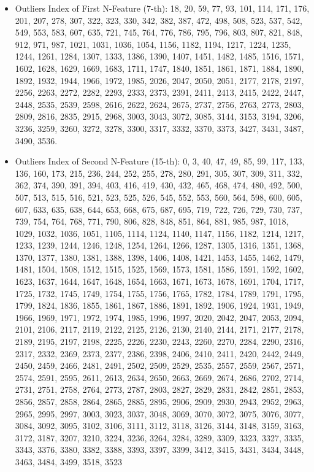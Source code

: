 \documentclass{article}
\begin{document}
\begin{itemize}
    \item Outliers Index of First N-Feature (7-th): 18, 20, 59, 77, 93, 101, 114, 171, 176, 201, 207, 278, 307, 322, 323, 330, 342, 382, 387, 472, 498, 508, 523, 537, 542, 549, 553, 583, 607, 635, 721, 745, 764, 776, 786, 795, 796, 803, 807, 821, 848, 912, 971, 987, 1021, 1031, 1036, 1054, 1156, 1182, 1194, 1217, 1224, 1235, 1244, 1261, 1284, 1307, 1333, 1386, 1390, 1407, 1451, 1482, 1485, 1516, 1571, 1602, 1628, 1629, 1669, 1683, 1711, 1747, 1840, 1851, 1861, 1871, 1884, 1890, 1892, 1932, 1944, 1966, 1972, 1985, 2026, 2047, 2050, 2051, 2177, 2178, 2197, 2256, 2263, 2272, 2282, 2293, 2333, 2373, 2391, 2411, 2413, 2415, 2422, 2447, 2448, 2535, 2539, 2598, 2616, 2622, 2624, 2675, 2737, 2756, 2763, 2773, 2803, 2809, 2816, 2835, 2915, 2968, 3003, 3043, 3072, 3085, 3144, 3153, 3194, 3206, 3236, 3259, 3260, 3272, 3278, 3300, 3317, 3332, 3370, 3373, 3427, 3431, 3487, 3490, 3536.
    \item Outliers Index of Second N-Feature (15-th): 0, 3, 40, 47, 49, 85, 99, 117, 133, 136, 160, 173, 215, 236, 244, 252, 255, 278, 280, 291, 305, 307, 309, 311, 332, 362, 374, 390, 391, 394, 403, 416, 419, 430, 432, 465, 468, 474, 480, 492, 500, 507, 513, 515, 516, 521, 523, 525, 526, 545, 552, 553, 560, 564, 598, 600, 605, 607, 633, 635, 638, 644, 653, 668, 675, 687, 695, 719, 722, 726, 729, 730, 737, 739, 754, 764, 768, 771, 790, 806, 828, 848, 851, 864, 881, 985, 987, 1018, 1029, 1032, 1036, 1051, 1105, 1114, 1124, 1140, 1147, 1156, 1182, 1214, 1217, 1233, 1239, 1244, 1246, 1248, 1254, 1264, 1266, 1287, 1305, 1316, 1351, 1368, 1370, 1377, 1380, 1381, 1388, 1398, 1406, 1408, 1421, 1453, 1455, 1462, 1479, 1481, 1504, 1508, 1512, 1515, 1525, 1569, 1573, 1581, 1586, 1591, 1592, 1602, 1623, 1637, 1644, 1647, 1648, 1654, 1663, 1671, 1673, 1678, 1691, 1704, 1717, 1725, 1732, 1745, 1749, 1754, 1755, 1756, 1765, 1782, 1784, 1789, 1791, 1795, 1799, 1824, 1836, 1855, 1861, 1867, 1886, 1891, 1892, 1906, 1924, 1931, 1949, 1966, 1969, 1971, 1972, 1974, 1985, 1996, 1997, 2020, 2042, 2047, 2053, 2094, 2101, 2106, 2117, 2119, 2122, 2125, 2126, 2130, 2140, 2144, 2171, 2177, 2178, 2189, 2195, 2197, 2198, 2225, 2226, 2230, 2243, 2260, 2270, 2284, 2290, 2316, 2317, 2332, 2369, 2373, 2377, 2386, 2398, 2406, 2410, 2411, 2420, 2442, 2449, 2450, 2459, 2466, 2481, 2491, 2502, 2509, 2529, 2535, 2557, 2559, 2567, 2571, 2574, 2591, 2595, 2611, 2613, 2634, 2650, 2663, 2669, 2674, 2686, 2702, 2714, 2731, 2751, 2758, 2764, 2773, 2787, 2803, 2827, 2829, 2831, 2842, 2851, 2853, 2856, 2857, 2858, 2864, 2865, 2885, 2895, 2906, 2909, 2930, 2943, 2952, 2963, 2965, 2995, 2997, 3003, 3023, 3037, 3048, 3069, 3070, 3072, 3075, 3076, 3077, 3084, 3092, 3095, 3102, 3106, 3111, 3112, 3118, 3126, 3144, 3148, 3159, 3163, 3172, 3187, 3207, 3210, 3224, 3236, 3264, 3284, 3289, 3309, 3323, 3327, 3335, 3343, 3376, 3380, 3382, 3388, 3393, 3397, 3399, 3412, 3415, 3431, 3434, 3448, 3463, 3484, 3499, 3518, 3523

\end{itemize}
\end{document}
